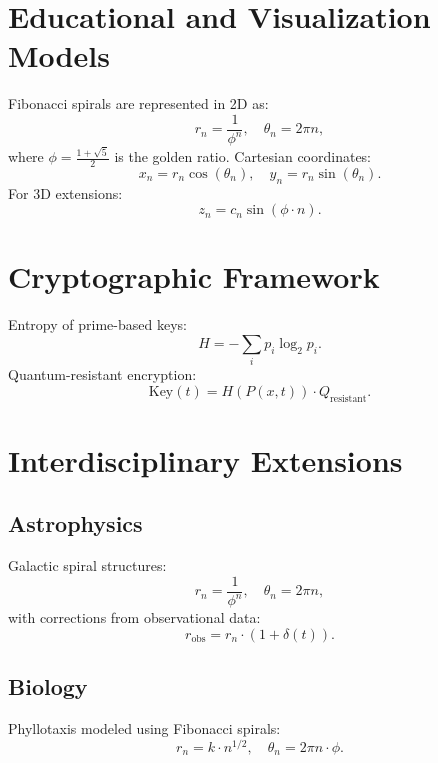 \documentclass{article}
\theoremstyle{plain}
\begin{document}
\section{Educational and Visualization Models}
Fibonacci spirals are represented in 2D as:
\begin{equation}
    r_n = \frac{1}{\phi^n}, \quad \theta_n = 2\pi n,
\end{equation}
where $\phi = \frac{1 + \sqrt{5}}{2}$ is the golden ratio. Cartesian coordinates:
\begin{equation}
    x_n = r_n \cos(\theta_n), \quad y_n = r_n \sin(\theta_n).
\end{equation}
For 3D extensions:
\begin{equation}
    z_n = c_n \sin(\phi \cdot n).
\end{equation}

\section{Cryptographic Framework}
Entropy of prime-based keys:
\begin{equation}
    H = - \sum_{i} p_i \log_2 p_i.
\end{equation}
Quantum-resistant encryption:
\begin{equation}
    \text{Key}(t) = H(P(x, t)) \cdot Q_{\text{resistant}}.
\end{equation}

\section{Interdisciplinary Extensions}
\subsection{Astrophysics}
Galactic spiral structures:
\begin{equation}
    r_n = \frac{1}{\phi^n}, \quad \theta_n = 2\pi n,
\end{equation}
with corrections from observational data:
\begin{equation}
    r_{\text{obs}} = r_n \cdot (1 + \delta(t)).
\end{equation}
\subsection{Biology}
Phyllotaxis modeled using Fibonacci spirals:
\begin{equation}
    r_n = k \cdot n^{1/2}, \quad \theta_n = 2\pi n \cdot \phi.
\end{equation}
\end{document}
